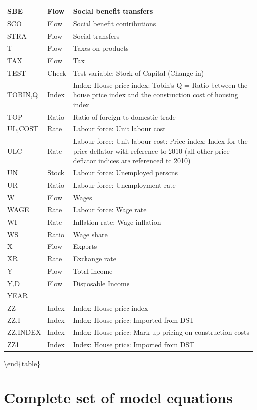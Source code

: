 \documentclass[
]{book}
\begin{document}
\begin{tabular}[t]{l|l|l}
\hline
SBE & Flow & Social benefit transfers\\
\hline
SCO & Flow & Social benefit contributions\\
\hline
STRA & Flow & Social transfers\\
\hline
T & Flow & Taxes on products\\
\hline
TAX & Flow & Tax\\
\hline
TEST & Check & Test variable: Stock of Capital (Change in)\\
\hline
TOBIN,Q & Index & Index: House price index: Tobin's Q = Ratio between the house price index and the construction cost of housing index\\
\hline
TOP & Ratio & Ratio of foreign to domestic trade\\
\hline
UL,COST & Rate & Labour force: Unit labour cost\\
\hline
ULC & Rate & Labour force: Unit labour cost: Price index: Index for the price deflator with reference to 2010 (all other price deflator indices are referenced to 2010)\\
\hline
UN & Stock & Labour force: Unemployed persons\\
\hline
UR & Ratio & Labour force: Unemployment rate\\
\hline
W & Flow & Wages\\
\hline
WAGE & Rate & Labour force: Wage rate\\
\hline
WI & Rate & Inflation rate: Wage inflation\\
\hline
WS & Ratio & Wage share\\
\hline
X & Flow & Exports\\
\hline
XR & Rate & Exchange rate\\
\hline
Y & Flow & Total income\\
\hline
Y,D & Flow & Disposable Income\\
\hline
YEAR &  & \\
\hline
ZZ & Index & Index: House price index\\
\hline
ZZ,I & Index & Index: House price: Imported from DST\\
\hline
ZZ,INDEX & Index & Index: House price: Mark-up pricing on construction costs\\
\hline
ZZ1 & Index & Index: House price: Imported from DST\\
\hline
\end{tabular}

\textbackslash end\{table\}

\hypertarget{sec:fi-fl-sfc-full-model}{%
\section{Complete set of model equations}\label{sec:fi-fl-sfc-full-model}}
\end{document}
